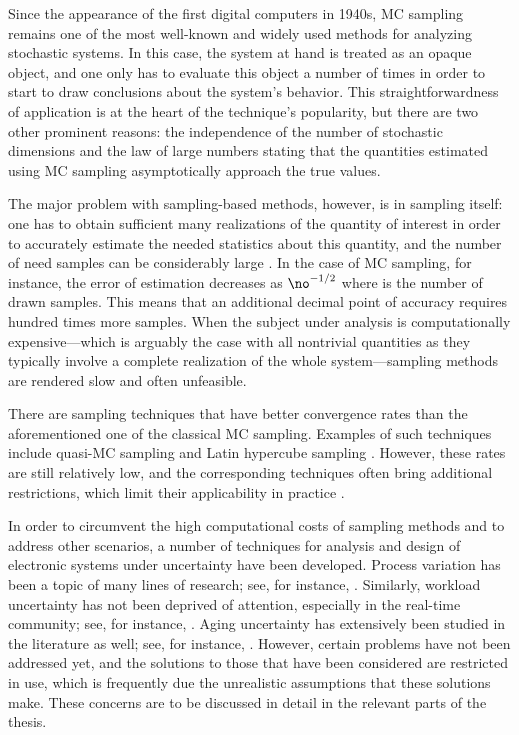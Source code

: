 Since the appearance of the first digital computers in 1940s, \ac{MC} sampling
remains one of the most well-known and widely used methods for analyzing
stochastic systems. In this case, the system at hand is treated as an opaque
object, and one only has to evaluate this object a number of times in order to
start to draw conclusions about the system's behavior. This straightforwardness
of application is at the heart of the technique's popularity, but there are two
other prominent reasons: the independence of the number of stochastic dimensions
and the law of large numbers \cite{durrett2010} stating that the quantities
estimated using \ac{MC} sampling asymptotically approach the true values.

The major problem with sampling-based methods, however, is in sampling itself:
one has to obtain sufficient many realizations of the quantity of interest in
order to accurately estimate the needed statistics about this quantity, and the
number of need samples can be considerably large \cite{diaz-emparanza2002}. In
the case of \ac{MC} sampling, for instance, the error of estimation decreases as
$\no^{-1/2}$ where \no is the number of drawn samples. This means that an
additional decimal point of accuracy requires hundred times more samples. When
the subject under analysis is computationally expensive---which is arguably the
case with all nontrivial quantities as they typically involve a complete
realization of the whole system---sampling methods are rendered slow and often
unfeasible.

There are sampling techniques that have better convergence rates than the
aforementioned one of the classical \ac{MC} sampling. Examples of such
techniques include quasi-\ac{MC} sampling and Latin hypercube sampling
\cite{asmussen2007}. However, these rates are still relatively low, and the
corresponding techniques often bring additional restrictions, which limit their
applicability in practice \cite{xiu2010}.

In order to circumvent the high computational costs of sampling methods and to
address other scenarios, a number of techniques for analysis and design of
electronic systems under uncertainty have been developed. Process variation has
been a topic of many lines of research; see, for instance, \cite{bhardwaj2006,
bhardwaj2008, chandra2010, juan2012, lee2013}. Similarly, workload uncertainty
has not been deprived of attention, especially in the real-time community; see,
for instance, \cite{diaz2002, santinelli2011, quinton2012, tanasa2015}. Aging
uncertainty has extensively been studied in the literature as well; see, for
instance, \cite{coskun2006, huang2009b, das2014c}. However, certain problems
have not been addressed yet, and the solutions to those that have been
considered are restricted in use, which is frequently due the unrealistic
assumptions that these solutions make. These concerns are to be discussed in
detail in the relevant parts of the thesis.
